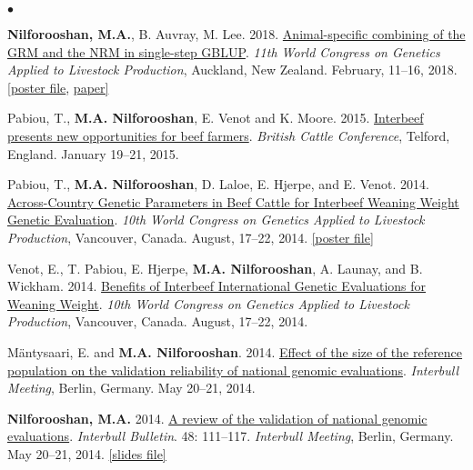 \documentclass[margin,line]{res}
\newenvironment{list2}{
  \begin{list}{$\bullet$}{%
      \setlength{\itemsep}{0in}
      \setlength{\parsep}{0in} \setlength{\parskip}{0in}
      \setlength{\topsep}{0in} \setlength{\partopsep}{0in}
      \setlength{\leftmargin}{0.2in}}}{\end{list}}
\begin{document}
\begin{resume}
\begin{list2}
\item {\bf Nilforooshan, M.A.}, B. Auvray, M. Lee. 2018. \href{http://www.wcgalp.org/proceedings/2018/animal-specific-combining-grm-and-nrm-single-step-gblup}{Animal-specific combining of the GRM and the NRM in single-step GBLUP}. {\em 11th World Congress on Genetics Applied to Livestock Production}, Auckland, New Zealand. February, 11--16, 2018. \href{https://drive.google.com/file/d/1cCNViHs-Dyrmbx3PWbbtQv090rVyx0cL/view?usp=sharing}{[poster file}, \href{https://drive.google.com/file/d/1L-yElfdNZz6nx3tB_TwudN3h9PpF5Pxs/view?usp=sharing}{paper]}
\item Pabiou, T., {\bf M.A. Nilforooshan}, E. Venot and  K. Moore. 2015. \href{https://www.cattlebreeders.org.uk/workspace/documents/2015digest.pdf}{Interbeef presents new opportunities for beef farmers}. {\em British Cattle Conference}, Telford, England. January 19--21, 2015.
\item Pabiou, T., {\bf M.A. Nilforooshan}, D. Laloe, E. Hjerpe, and E. Venot. 2014. \href{http://www.wcgalp.org/proceedings/2014/across-country-genetic-parameters-beef-cattle-interbeef-weaning-weight-genetic}{Across-Country Genetic Parameters in Beef Cattle for Interbeef Weaning Weight Genetic Evaluation}. {\em 10th World Congress on Genetics Applied to Livestock Production}, Vancouver, Canada. August, 17--22, 2014. \href{https://drive.google.com/file/d/0B2l_izQwJmVpVzRvOVl1YnNuWjA/view?usp=sharing}{[poster file]}
\item Venot, E., T. Pabiou, E. Hjerpe, {\bf M.A. Nilforooshan}, A. Launay, and B. Wickham. 2014. \href{http://www.wcgalp.org/proceedings/2014/benefits-interbeef-international-genetic-evaluations-weaning-weight}{Benefits of Interbeef International Genetic Evaluations for Weaning Weight}. {\em 10th World Congress on Genetics Applied to Livestock Production}, Vancouver, Canada. August, 17--22, 2014.
\item M\"{a}ntysaari, E. and {\bf M.A. Nilforooshan}. 2014. \href{https://www.interbull.org/web/static/presentations/Berlin/Wednesday/10_14_Mantysaari.pdf}{Effect of the size of the reference population on the validation reliability of national genomic evaluations}. {\em Interbull Meeting}, Berlin, Germany. May 20--21, 2014.
\item {\bf Nilforooshan, M.A.} 2014. \href{https://journal.interbull.org/index.php/ib/article/view/1360}{A review of the validation of national genomic evaluations}. {\em Interbull Bulletin}. 48: 111--117. {\em Interbull Meeting}, Berlin, Germany. May 20--21, 2014. \href{https://www.interbull.org/web/static/presentations/Berlin/Wednesday/10_01_Nilforooshan.pdf}{[slides file]}

\end{list2}
\end{resume}
\end{document}
